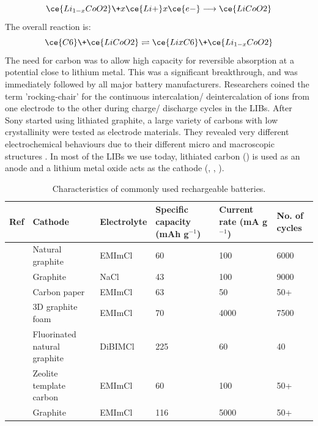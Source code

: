 \begin{equation}
\ce{Li_{1-x}CoO2} \+ x\ce{Li+} x\ce{e-} \longrightarrow \ce{LiCoO2}
\end{equation}
The overall reaction is:
\begin{equation}
\ce{C6} \+ \ce{LiCoO2} \rightleftharpoons \ce{LixC6} \+ \ce{Li_{1-x}CoO2}
\end{equation}
The need for carbon was to allow high capacity for reversible  absorption at a potential close to lithium metal. This was a significant breakthrough, and was immediately followed by all major battery manufacturers. Researchers coined the term 'rocking-chair' for the  continuous intercalation/ deintercalation of ions from one electrode to the other during charge/ discharge cycles in the LIBs. After Sony started using lithiated graphite, a large variety of carbons with low crystallinity were tested as electrode materials. They revealed very different electrochemical behaviours due to their different micro and macroscopic structures \cite{yoo_large_2008}. In most of the LIBs we use today, lithiated carbon () is used as an anode and a lithium metal oxide acts as the cathode (, , ).  

\begin{table}
\caption{Characteristics of commonly used rechargeable batteries.} \label{tabCref}
\begin{center}
\begin{tabular}{ |p{0.5cm}|p{2.5cm}|p{2cm}|p{2.5cm}|p{2.5cm}|p{1.5cm}|}
\hline
\textbf{Ref} & \textbf{Cathode} & \textbf{Electrolyte} & \textbf{Specific capacity (mAh g$^{-1}$)} & \textbf{Current rate (mA g$^{-1}$)} & \textbf{No. of cycles} \\
\hline
\cite{wang_advanced_2017} & Natural graphite & EMImCl & 60 & 100 & 6000 \\
\cite{song_long-life_2017} & Graphite & NaCl & 43 & 100 & 9000 \\
\cite{sun_new_2015} & Carbon paper & EMImCl & 63 & 50 & 50+ \\
\cite{lin_ultrafast_2015} & 3D graphite foam & EMImCl & 70 & 4000 & 7500 \\
\cite{rani_fluorinated_2013} & Fluorinated natural graphite & DiBIMCl & 225 & 60 & 40 \\
\cite{stadie_zeolite-templated_2017} & Zeolite template carbon & EMImCl & 60 & 100 & 50+ \\
& Graphite & EMImCl & 116 & 5000 & 50+ \\*

\hline
\end{tabular}
\end{center}
\end{table}

